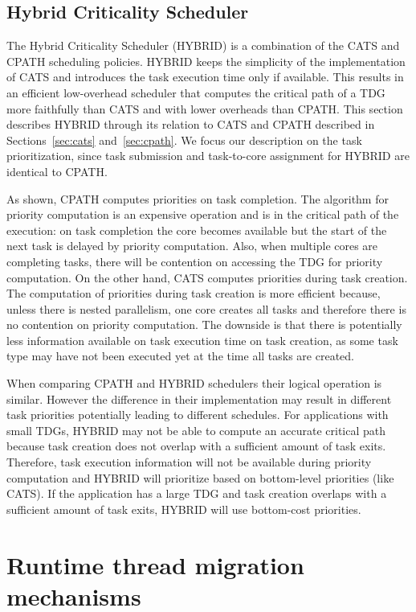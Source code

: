 \subsection{Hybrid Criticality Scheduler}
\label{sec:hybrid}
The Hybrid Criticality Scheduler (HYBRID) is a combination of the CATS and CPATH scheduling policies.
HYBRID keeps the simplicity of the implementation of CATS and introduces the task execution time only if available.
This results in an efficient low-overhead scheduler that computes the critical path of a TDG more faithfully than CATS and with lower overheads than CPATH.
This section describes HYBRID through its relation to CATS and CPATH described in Sections~\ref{sec:cats} and~\ref{sec:cpath}. 
We focus our description on the task prioritization, since task submission and task-to-core assignment for HYBRID are identical to CPATH.

As shown, CPATH computes priorities on task completion. 
The algorithm for priority computation is an expensive operation and is in the critical path of the execution:
on task completion the core becomes available but the start of the next task is delayed by priority computation.
Also, when multiple cores are completing tasks, there will be contention on accessing the TDG for priority computation.
On the other hand, CATS computes priorities during task creation.
The computation of priorities during task creation is more efficient because, unless there is nested parallelism, one core creates all tasks
and therefore there is no contention on priority computation. The downside is that there is potentially less information available 
on task execution time on task creation, as some task type may have not been executed yet at the time all tasks are created.

When comparing CPATH and HYBRID schedulers their logical operation is similar.
However the difference in their implementation may result in different task priorities potentially leading to different schedules.
For applications with small TDGs, HYBRID may not be able to compute an accurate critical path because task creation does not overlap with a sufficient amount of task exits.
Therefore, task execution information will not be available during priority computation and HYBRID will prioritize based on bottom-level priorities (like CATS).
If the application has a large TDG and task creation overlaps with a sufficient amount of task exits, HYBRID will use bottom-cost priorities.

\section{Runtime thread migration mechanisms}

